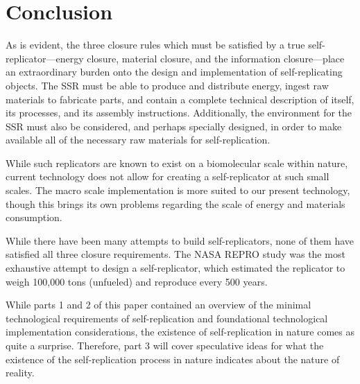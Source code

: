 \section{Conclusion}

As is evident, the three closure rules which must be satisfied by a
true self-replicator---energy closure, material closure, 
and the information closure---place an extraordinary burden onto
the design and implementation of self-replicating objects.  The
SSR must be able to produce and distribute energy, ingest raw
materials to fabricate parts, and contain a complete technical
description of itself, its processes, and its assembly instructions.
Additionally, the environment for the SSR must also be considered, 
and perhaps specially designed, in order to make available all
of the necessary raw materials for self-replication.

While such replicators are known to exist on a biomolecular scale within nature,
current technology does not allow for creating a self-replicator 
at such small scales.  The macro scale implementation is more suited
to our present technology, though this brings its own problems regarding 
the scale of energy and materials consumption.  

While there have been many attempts to build self-replicators, none of them have
satisfied all three closure requirements.  The NASA REPRO study was the most
exhaustive attempt to design a self-replicator, which estimated the replicator
to weigh 100,000 tons (unfueled) and reproduce every 500 years.

While parts 1 and 2 of this paper contained an overview of the minimal technological
requirements of self-replication and foundational technological implementation considerations,
the existence of self-replication in nature comes as quite a surprise.  Therefore, part 3
will cover speculative ideas for what the existence of the self-replication process in
nature indicates about the nature of reality.


